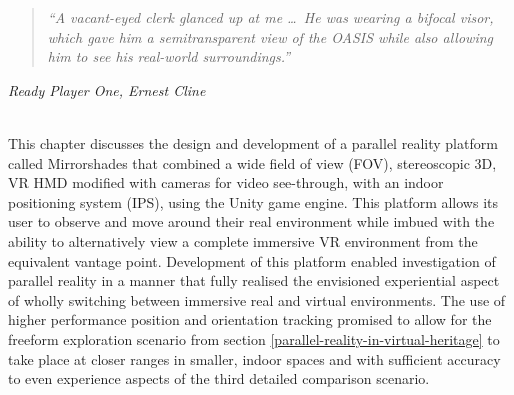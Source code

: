 \begin{quote}
	\textit{``A vacant-eyed clerk glanced up at me \ldots\ He was wearing a bifocal visor, which gave him a semitransparent view of the OASIS while also allowing him to see his real-world surroundings.''}%
\end{quote}
\hfill \textit{Ready Player One, Ernest Cline}
\\
\\


\label{chapter-mirrorshades}

This chapter discusses the design and development of a parallel reality platform called Mirrorshades that combined a wide field of view (FOV), stereoscopic 3D, VR HMD modified with cameras for video see-through, with an indoor positioning system (IPS), using the Unity game engine. This platform allows its user to observe and move around their real environment while imbued with the ability to alternatively view a complete immersive VR environment from the equivalent vantage point. Development of this platform enabled investigation of parallel reality in a manner that fully realised the envisioned experiential aspect of wholly switching between immersive real and virtual environments. The use of higher performance position and orientation tracking promised to allow for the freeform exploration scenario from section \ref{parallel-reality-in-virtual-heritage} to take place at closer ranges in smaller, indoor spaces and with sufficient accuracy to even experience aspects of the third detailed comparison scenario.


